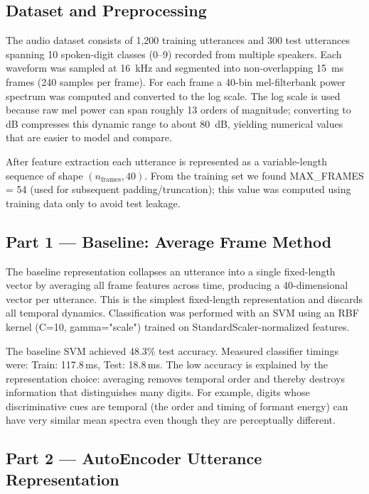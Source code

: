 \begingroup
\graphicspath{{../prob_4/Figures/}}

\subsection{Dataset and Preprocessing}
The audio dataset consists of 1,200 training utterances and 300 test utterances spanning 10 spoken-digit classes (0--9) recorded from multiple speakers. Each waveform was sampled at 16~kHz and segmented into non-overlapping 15~ms frames (240 samples per frame). For each frame a 40-bin mel-filterbank power spectrum was computed and converted to the log scale. The log scale is used because raw mel power can span roughly 13 orders of magnitude; converting to dB compresses this dynamic range to about 80~dB, yielding numerical values that are easier to model and compare.

After feature extraction each utterance is represented as a variable-length sequence of shape $(n_{\text{frames}},40)$. From the training set we found MAX\_FRAMES = 54 (used for subsequent padding/truncation); this value was computed using training data only to avoid test leakage.

\subsection{Part 1 — Baseline: Average Frame Method}
The baseline representation collapses an utterance into a single fixed-length vector by averaging all frame features across time, producing a 40-dimensional vector per utterance. This is the simplest fixed-length representation and discards all temporal dynamics. Classification was performed with an SVM using an RBF kernel (C=10, gamma="scale") trained on StandardScaler-normalized features.

The baseline SVM achieved 48.3\% test accuracy. Measured classifier timings were: Train: 117.8\,ms, Test: 18.8\,ms. The low accuracy is explained by the representation choice: averaging removes temporal order and thereby destroys information that distinguishes many digits. For example, digits whose discriminative cues are temporal (the order and timing of formant energy) can have very similar mean spectra even though they are perceptually different.

\subsection{Part 2 — AutoEncoder Utterance Representation}

